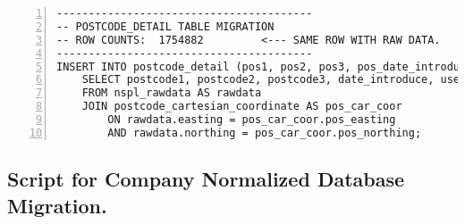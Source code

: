 \begin{lstlisting}[breaklines, frame=single, numbers=left, caption={PL/pgSQL's DML Script for Postcode Normalized Database Migration.}, label=commandline-02]
----------------------------------------
-- POSTCODE_DETAIL TABLE MIGRATION 
-- ROW COUNTS:  1754882 		<--- SAME ROW WITH RAW DATA.  
----------------------------------------
INSERT INTO postcode_detail (pos1, pos2, pos3, pos_date_introduce, pos_usertype, pos_cart_coordinate_id, position_quality, pos_spatial_accuracy, pos_location, pos_socrataid, pos_last_upload)
	SELECT postcode1, postcode2, postcode3, date_introduce, usertype, pos_cart_coordinate_id, position_quality, spatial_accuracy, location, socrataid, last_upload
	FROM nspl_rawdata AS rawdata
	JOIN postcode_cartesian_coordinate AS pos_car_coor	
		ON rawdata.easting = pos_car_coor.pos_easting 
		AND rawdata.northing = pos_car_coor.pos_northing; 

\end{lstlisting}

\subsection{Script for Company Normalized Database Migration.}

